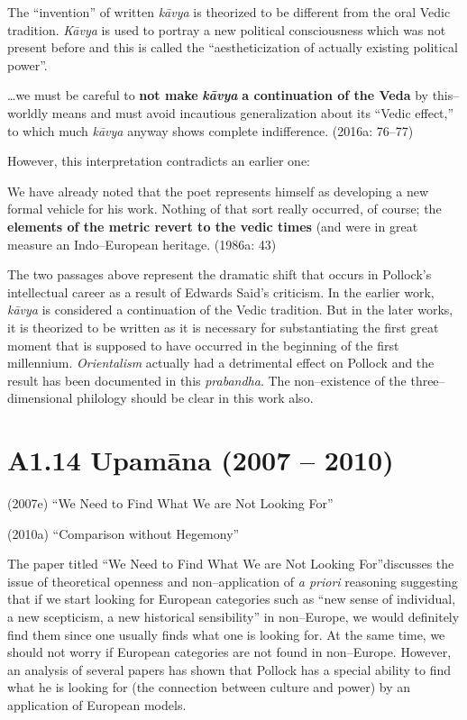 The “invention” of written \textit{kāvya} is theorized to be different from the oral Vedic tradition. \textit{Kāvya }is used to portray a new political consciousness which was not present before and this is called the “aestheticization of actually existing political power”.

\begin{myquote}
…we must be careful to \textbf{not make }\textit{\textbf{kāvya }}\textbf{a continuation of the Veda} by this–worldly means and must avoid incautious generalization about its “Vedic effect,” to which much\textit{ kāvya }anyway shows complete indifference. (2016a: 76–77)
\end{myquote}

However, this interpretation contradicts an earlier one:

\begin{myquote}
We have already noted that the poet represents himself as developing a new formal vehicle for his work. Nothing of that sort really occurred, of course; the \textbf{elements of the metric revert to the vedic times} (and were in great measure an Indo–European heritage. (1986a: 43)
\end{myquote}

The two passages above represent the dramatic shift that occurs in Pollock’s intellectual career as a result of Edwards Said’s criticism. In the earlier work, \textit{kāvya }is considered a continuation of the Vedic tradition. But in the later works, it is theorized to be written as it is necessary for substantiating the first great moment that is supposed to have occurred in the beginning of the first millennium. \textit{Orientalism} actually had a detrimental effect on Pollock and the result has been documented in this \textit{prabandha}. The non–existence of the three–dimensional philology should be clear in this work also.


\section*{A1.14 Upamāna (2007 – 2010)}

(2007e) “We Need to Find What We are Not Looking For”

(2010a) “Comparison without Hegemony”

The paper titled “We Need to Find What We are Not Looking For”discusses the issue of theoretical openness and non–application of \textit{a priori} reasoning suggesting that if we start looking for European categories such as “new sense of individual, a new scepticism, a new historical sensibility” in non–Europe, we would definitely find them since one usually finds what one is looking for. At the same time, we should not worry if European categories are not found in non–Europe. However, an analysis of several papers has shown that Pollock has a special ability to find what he is looking for (the connection between culture and power) by an application of European models.


